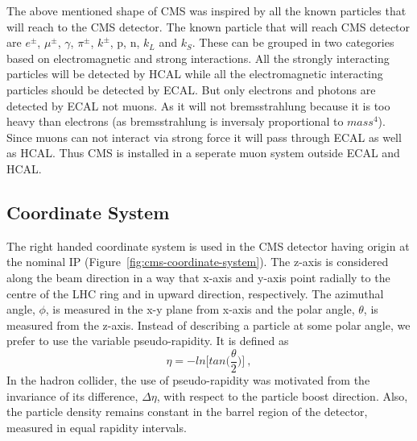 The above mentioned shape of CMS was inspired by all the known particles that will reach to the CMS detector.
The known particle that will reach CMS detector are $e^{\pm}$, $\mu^{\pm}$, $\gamma$, $\pi^{\pm}$, $k^{\pm}$, p, n, $k_{L}$ and $k_{S}$.
These can be grouped in two categories based on electromagnetic and strong interactions.
All the strongly interacting particles will be detected by HCAL while all the electromagnetic interacting particles should be detected by ECAL.
But only electrons and photons are detected by ECAL not muons.
As it will not bremsstrahlung because it is too heavy than electrons (as bremsstrahlung is inversaly proportional to $mass^4$).
Since muons can not interact via strong force it will pass through ECAL as well as HCAL.
Thus CMS is installed in a seperate muon system outside ECAL and HCAL.

\subsection{Coordinate System} %
\label{sub:coordinate_system}
The right handed coordinate system is used in the CMS detector having origin at the nominal IP (Figure~\ref{fig:cms-coordinate-system}). The z-axis is considered along the beam direction in a way that x-axis and y-axis point radially to the centre of the LHC ring and in upward direction, respectively. The azimuthal angle, $\phi$, is measured in the x-y plane from x-axis and the polar angle, $\theta$, is measured from the z-axis. Instead of describing a particle at some polar angle, we prefer to use the variable pseudo-rapidity. It is defined as 
\begin{equation}
	\eta = -ln\bigg[tan\Big(\frac{\theta}{2}\Big)\bigg]~,
\end{equation}
In the hadron collider, the use of pseudo-rapidity was motivated from the invariance of its difference, $\Delta \eta$, with respect to the particle boost direction. Also, the particle density remains constant in the barrel region of the detector, measured in equal rapidity intervals.

